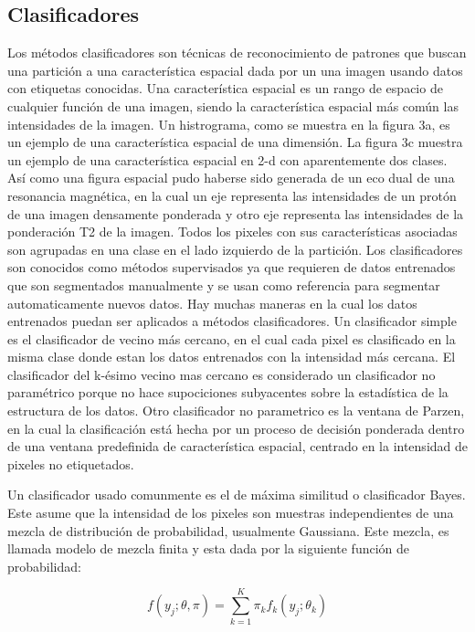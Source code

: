 \documentclass[12pt]{report}
\begin{document}
\subsection{Clasificadores}
Los métodos clasificadores son técnicas de reconocimiento de patrones que buscan una partición a una característica espacial dada por un una imagen usando datos con etiquetas conocidas.
Una característica espacial es un rango de espacio de cualquier función de una imagen, siendo la característica espacial más común las intensidades de la imagen. Un histrograma, como se muestra en la figura 3a, es un ejemplo de una característica espacial de una dimensión. La figura 3c muestra un ejemplo de una característica espacial en 2-d con aparentemente dos clases.
Así como una figura espacial pudo haberse sido generada de un eco dual de una resonancia magnética, en la cual un eje representa las intensidades de un protón de una imagen densamente ponderada y otro eje representa las intensidades de la ponderación T2 de la imagen.
Todos los pixeles con sus características asociadas son agrupadas en una clase en el lado izquierdo de la partición.
Los clasificadores son conocidos como métodos supervisados ya que requieren de datos entrenados que son segmentados manualmente y se usan como referencia para segmentar automaticamente nuevos datos.
Hay muchas maneras en la cual los datos entrenados puedan ser aplicados a métodos clasificadores. Un clasificador simple es el clasificador de vecino más cercano, en el cual cada pixel es clasificado en la misma clase donde estan los datos entrenados con la intensidad más cercana. El clasificador del k-ésimo vecino mas cercano es considerado un clasificador no paramétrico porque no hace supociciones subyacentes sobre la estadística de la estructura de los datos.
Otro clasificador no parametrico es la ventana de Parzen, en  la cual la clasificación está hecha por un proceso de decisión ponderada dentro de una ventana predefinida de característica espacial, centrado en la intensidad de pixeles no etiquetados.

Un clasificador usado comunmente es el de  máxima similitud o clasificador Bayes. Este asume que la intensidad de los pixeles son muestras independientes de una mezcla de distribución de probabilidad, usualmente Gaussiana. Este mezcla, es llamada modelo de mezcla finita y esta dada por la siguiente función de probabilidad:

\begin{equation} f(y_{j};\theta,\pi) = \sum_{k = 1}^{K} \pi_{k} f_{k} (y_{j} ; \theta_{k}) \end{equation}
\end{document}
